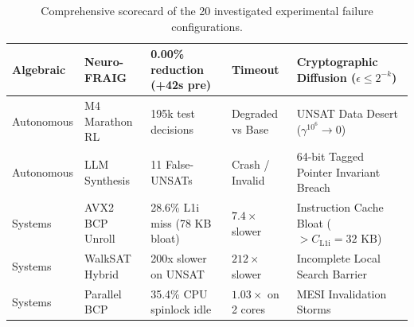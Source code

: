 \documentclass[11pt]{article}
\theoremstyle{definition}
\begin{document}
\begin{table}[h!]
\begin{tabular}{@{}llllp{5.5cm}@{}}
Algebraic & Neuro-FRAIG & 0.00\% reduction (+42s pre) & Timeout & Cryptographic Diffusion ($\epsilon \le 2^{-k}$) \\
\midrule
Autonomous & M4 Marathon RL & 195k test decisions & Degraded vs Base & UNSAT Data Desert ($\gamma^{10^6} \to 0$) \\
Autonomous & LLM Synthesis & 11 False-UNSATs & Crash / Invalid & 64-bit Tagged Pointer Invariant Breach \\
\midrule
Systems & AVX2 BCP Unroll & 28.6\% L1i miss (78 KB bloat) & $7.4\times$ slower & Instruction Cache Bloat ($> C_{\text{L1i}} = 32\text{ KB}$) \\
Systems & WalkSAT Hybrid & 200x slower on UNSAT & $212\times$ slower & Incomplete Local Search Barrier \\
Systems & Parallel BCP & 35.4\% CPU spinlock idle & $1.03\times$ on 2 cores & MESI Invalidation Storms \\
\bottomrule
\end{tabular}
\caption{Comprehensive scorecard of the 20 investigated experimental failure configurations.}
\label{tab:master_scorecard}
\end{table}
\end{document}
